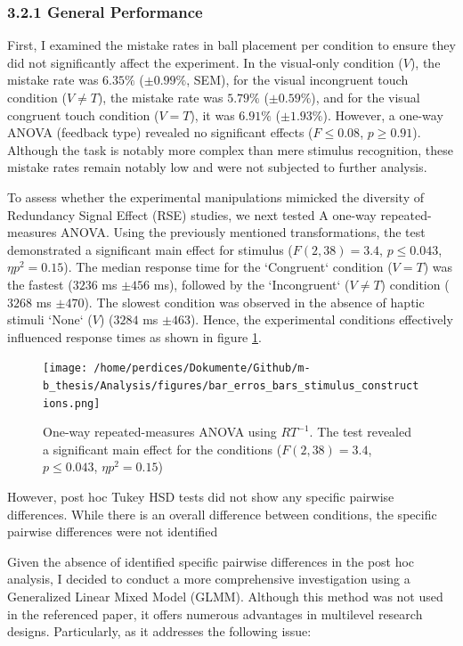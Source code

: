 \documentclass[12pt,oneside,openright]{report}
\begin{document}
\subsubsection*{3.2.1 General Performance}

First, I examined the mistake rates in ball placement per condition to ensure they did not significantly affect the experiment. In the visual-only condition ($V$), the mistake rate was $6.35\%$ ($\pm 0.99\%$, SEM), for the visual incongruent touch condition ($V \neq T$), the mistake rate was $5.79\%$ ($\pm 0.59\%$), and for the visual congruent touch condition ($V=T$), it was $6.91\%$ ($ \pm 1.93\%$). However, a one-way ANOVA (feedback type) revealed no significant effects ($ F \leq 0.08$, $p \geq 0.91$). Although the task is notably more complex than mere stimulus recognition, these mistake rates remain notably low and were not subjected to further analysis.

To assess whether the experimental manipulations mimicked the diversity of Redundancy Signal Effect (RSE)  studies, we next tested A one-way repeated-measures ANOVA. Using the previously mentioned transformations, the test demonstrated a significant main effect for stimulus ($F(2,38) = 3.4$, $p \leq 0.043$, $\eta p^2 = 0.15$). The median response time for the `Congruent` condition ($V=T$) was the fastest ($3236$ ms $\pm 456$ ms), followed by the `Incongruent` ($V \neq T$) condition ($3268$ ms $\pm 470$). The slowest condition was observed in the absence of haptic stimuli `None` ($V$) ($3284$ ms $\pm 463$). Hence, the experimental conditions effectively influenced response times as shown in figure \ref{fig:error}.

\begin{figure}[!ht]
    \centering
    \texttt{[image: /home/perdices/Dokumente/Github/m-b\_thesis/Analysis/figures/bar\_erros\_bars\_stimulus\_constructions.png]}
    \caption{One-way repeated-measures ANOVA using $RT^{-1}$. The test revealed a significant main effect for the conditions ($F(2,38) = 3.4$, $p \leq 0.043$, $\eta p^2 = 0.15$)}
    \label{fig:error}
\end{figure}

However, post hoc Tukey HSD tests did not show any specific pairwise differences. While there is an overall difference between conditions, the specific pairwise differences were not identified

Given the absence of identified specific pairwise differences in the post hoc analysis, I decided to conduct a more comprehensive investigation using a Generalized Linear Mixed Model (GLMM). Although this method was not used in the referenced paper, it offers numerous advantages in multilevel research designs. Particularly, as it addresses the following issue:
\end{document}
